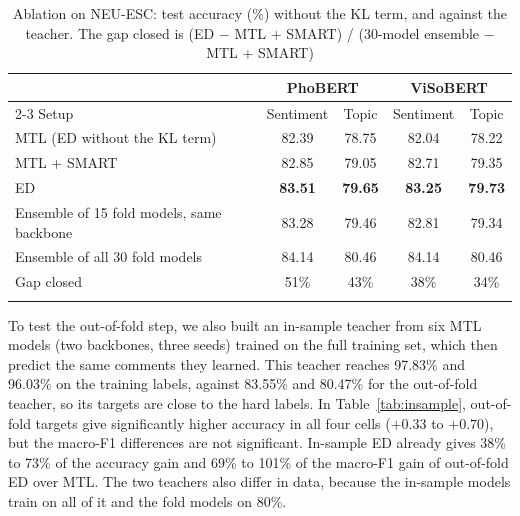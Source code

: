\documentclass[pdflatex,sn-mathphys-num]{sn-jnl}%
\theoremstyle{thmstyleone}%
\theoremstyle{thmstyletwo}%
\theoremstyle{thmstylethree}%
\begin{document}
\begin{table}[!htb]
\caption{Ablation on NEU-ESC: test accuracy (\%) without the KL term, and against the teacher. The gap closed is (ED $-$ MTL + SMART) / (30-model ensemble $-$ MTL + SMART)}\label{tab:ablation}
\footnotesize
\begin{tabular*}{\textwidth}{@{\extracolsep\fill}lcccc@{}}
\toprule
 & \multicolumn{2}{c}{PhoBERT} & \multicolumn{2}{c}{ViSoBERT} \\
\cmidrule{2-3}\cmidrule{4-5}
Setup & Sentiment & Topic & Sentiment & Topic \\
\midrule
MTL (ED without the KL term) & 82.39 & 78.75 & 82.04 & 78.22 \\
MTL + SMART & 82.85 & 79.05 & 82.71 & 79.35 \\
ED & \textbf{83.51} & \textbf{79.65} & \textbf{83.25} & \textbf{79.73} \\
Ensemble of 15 fold models, same backbone & 83.28 & 79.46 & 82.81 & 79.34 \\
Ensemble of all 30 fold models & 84.14 & 80.46 & 84.14 & 80.46 \\
Gap closed & 51\% & 43\% & 38\% & 34\% \\
\botrule
\end{tabular*}
\end{table}

To test the out-of-fold step, we also built an in-sample teacher from six MTL models (two backbones, three seeds) trained on the full training set, which then predict the same comments they learned. This teacher reaches 97.83\% and 96.03\% on the training labels, against 83.55\% and 80.47\% for the out-of-fold teacher, so its targets are close to the hard labels. In Table~\ref{tab:insample}, out-of-fold targets give significantly higher accuracy in all four cells ($+0.33$ to $+0.70$), but the macro-F1 differences are not significant. In-sample ED already gives 38\% to 73\% of the accuracy gain and 69\% to 101\% of the macro-F1 gain of out-of-fold ED over MTL. The two teachers also differ in data, because the in-sample models train on all of it and the fold models on 80\%.
\end{document}
